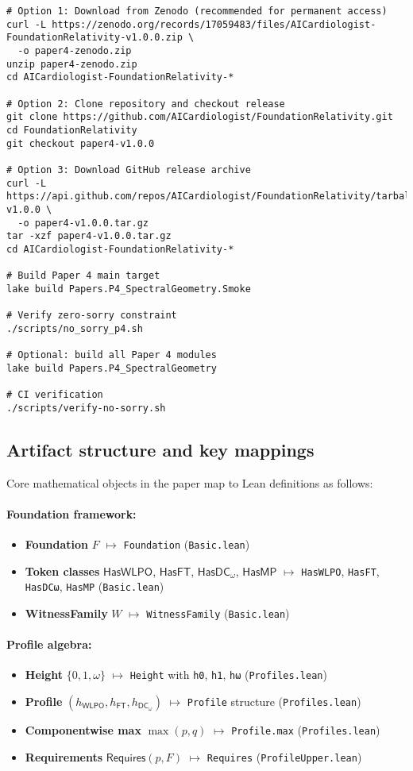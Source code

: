 \documentclass[11pt]{article}
\newcommand{\WLPO}{\mathsf{WLPO}}
\newcommand{\FT}{\mathsf{FT}}
\newcommand{\DCw}{\mathsf{DC}_{\omega}}
\newcommand{\lean}[1]{\texttt{#1}}
\theoremstyle{plain}
\theoremstyle{definition}
\theoremstyle{remark}
\newcommand{\HasWLPO}{\mathsf{HasWLPO}}
\newcommand{\HasFT}{\mathsf{HasFT}}
\newcommand{\HasDCw}{\mathsf{HasDC}_\omega}
\newcommand{\HasMP}{\mathsf{HasMP}}
\newcommand{\Requires}{\mathsf{Requires}}
\begin{document}
\begin{verbatim}
# Option 1: Download from Zenodo (recommended for permanent access)
curl -L https://zenodo.org/records/17059483/files/AICardiologist-FoundationRelativity-v1.0.0.zip \
  -o paper4-zenodo.zip
unzip paper4-zenodo.zip
cd AICardiologist-FoundationRelativity-*

# Option 2: Clone repository and checkout release
git clone https://github.com/AICardiologist/FoundationRelativity.git
cd FoundationRelativity
git checkout paper4-v1.0.0

# Option 3: Download GitHub release archive
curl -L https://api.github.com/repos/AICardiologist/FoundationRelativity/tarball/paper4-v1.0.0 \
  -o paper4-v1.0.0.tar.gz
tar -xzf paper4-v1.0.0.tar.gz
cd AICardiologist-FoundationRelativity-*

# Build Paper 4 main target
lake build Papers.P4_SpectralGeometry.Smoke

# Verify zero-sorry constraint
./scripts/no_sorry_p4.sh

# Optional: build all Paper 4 modules
lake build Papers.P4_SpectralGeometry

# CI verification
./scripts/verify-no-sorry.sh
\end{verbatim}

\subsection{Artifact structure and key mappings}
Core mathematical objects in the paper map to Lean definitions as follows:

\paragraph{Foundation framework:}
\begin{itemize}
\item \textbf{Foundation} $F$ $\mapsto$ \lean{Foundation} (\texttt{Basic.lean})
\item \textbf{Token classes} $\HasWLPO$, $\HasFT$, $\HasDCw$, $\HasMP$ $\mapsto$ \lean{HasWLPO}, \lean{HasFT}, \lean{HasDCω}, \lean{HasMP} (\texttt{Basic.lean})
\item \textbf{WitnessFamily} $W$ $\mapsto$ \lean{WitnessFamily} (\texttt{Basic.lean})
\end{itemize}

\paragraph{Profile algebra:}
\begin{itemize}
\item \textbf{Height} $\{0,1,\omega\}$ $\mapsto$ \lean{Height} with \lean{h0}, \lean{h1}, \lean{hω} (\texttt{Profiles.lean})
\item \textbf{Profile} $(h_{\WLPO}, h_{\FT}, h_{\DCw})$ $\mapsto$ \lean{Profile} structure (\texttt{Profiles.lean})
\item \textbf{Componentwise max} $\max(p,q)$ $\mapsto$ \lean{Profile.max} (\texttt{Profiles.lean})
\item \textbf{Requirements} $\Requires(p,F)$ $\mapsto$ \lean{Requires} (\texttt{ProfileUpper.lean})
\end{itemize}
\end{document}
